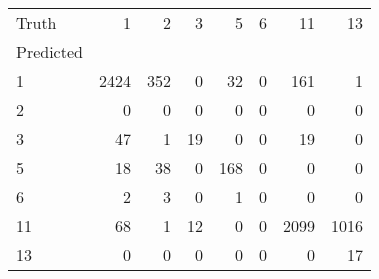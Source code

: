 \begin{tabular}{lrrrrrrr}
\toprule
Truth & 1 & 2 & 3 & 5 & 6 & 11 & 13 \\
Predicted &  &  &  &  &  &  &  \\
\midrule
1 & 2424 & 352 & 0 & 32 & 0 & 161 & 1 \\
2 & 0 & 0 & 0 & 0 & 0 & 0 & 0 \\
3 & 47 & 1 & 19 & 0 & 0 & 19 & 0 \\
5 & 18 & 38 & 0 & 168 & 0 & 0 & 0 \\
6 & 2 & 3 & 0 & 1 & 0 & 0 & 0 \\
11 & 68 & 1 & 12 & 0 & 0 & 2099 & 1016 \\
13 & 0 & 0 & 0 & 0 & 0 & 0 & 17 \\
\bottomrule
\end{tabular}
